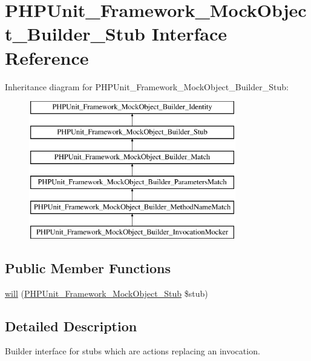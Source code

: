 \hypertarget{interface_p_h_p_unit___framework___mock_object___builder___stub}{}\section{P\+H\+P\+Unit\+\_\+\+Framework\+\_\+\+Mock\+Object\+\_\+\+Builder\+\_\+\+Stub Interface Reference}
\label{interface_p_h_p_unit___framework___mock_object___builder___stub}
Inheritance diagram for P\+H\+P\+Unit\+\_\+\+Framework\+\_\+\+Mock\+Object\+\_\+\+Builder\+\_\+\+Stub\+:\begin{figure}[H]
\begin{center}
\leavevmode
\includegraphics[height=6.000000cm]{interface_p_h_p_unit___framework___mock_object___builder___stub}
\end{center}
\end{figure}
\subsection*{Public Member Functions}
\begin{DoxyCompactItemize}
\item 
\mbox{\hyperlink{interface_p_h_p_unit___framework___mock_object___builder___stub_a0ca62ef89f1b4b06709f6db190ebbf58}{will}} (\mbox{\hyperlink{interface_p_h_p_unit___framework___mock_object___stub}{P\+H\+P\+Unit\+\_\+\+Framework\+\_\+\+Mock\+Object\+\_\+\+Stub}} \$stub)
\end{DoxyCompactItemize}


\subsection{Detailed Description}
Builder interface for stubs which are actions replacing an invocation.


